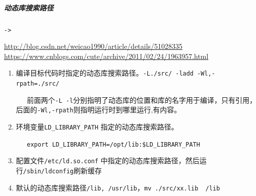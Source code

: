 \documentclass[UTF8,a4paper,12pt]{ctexbook}
\begin{document}
			
			\subparagraph{动态库搜索路径}\verb|->|
			
				\url{http://blog.csdn.net/weicao1990/article/details/51028335}			
				\url{https://www.cnblogs.com/cute/archive/2011/02/24/1963957.html}
				
				\begin{enumerate}[itemindent= 2em]
					\item 编译目标代码时指定的动态库搜索路径。\verb|-L./src/ -ladd -Wl,-rpath=./src/|
					
					\verb|   |前面两个\verb|-L -l|分别指明了动态库的位置和库的名字用于编译，只有引用， 后面的\verb|-Wl,-rpath|则指明运行时到哪里运行,有内容。
					
					\item 环境变量\verb|LD_LIBRARY_PATH| 指定的动态库搜索路径。
					
					\verb|   export LD_LIBRARY_PATH=/opt/lib:$LD_LIBRARY_PATH|
					\item 配置文件\verb|/etc/ld.so.conf| 中指定的动态库搜索路径，然后运行\verb|/sbin/ldconfig|刷新缓存
					\item 默认的动态库搜索路径\verb|/lib, /usr/lib|，\verb|mv ./src/xx.lib  /lib|
				\end{enumerate}
				    
\end{document}
